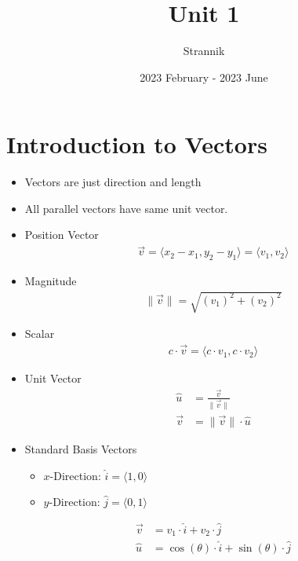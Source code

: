 \documentclass{article}
\title{Unit 1}
\author{Strannik}
\date{2023 February - 2023 June}
\begin{document}
\maketitle
\section{Introduction to Vectors}
\begin{itemize}
  \item Vectors are just direction and length
  \item All parallel vectors have same unit vector.
  \item{Position Vector}
  \begin{align}
    \vec{v} = \langle x_2 - x_1, y_2 - y_1 \rangle = \langle v_1, v_2 \rangle
  \end{align}
  \item{Magnitude}
  \begin{align}
    \|\vec{v}\| = \sqrt{(v_1)^2 + (v_2)^2}
  \end{align}
  \item{Scalar}
  \begin{align}
    c\cdot\vec{v} = \langle c\cdot v_1, c\cdot v_2 \rangle
  \end{align}
  \item{Unit Vector}
  \begin{align}
    \hat{u} &= \frac{\vec{v}}{\|\vec{v}\|} \\
    \vec{v} &= \|\vec{v}\|\cdot\hat{u}
  \end{align}
  \item{Standard Basis Vectors}
  \begin{itemize}
    \item $x$-Direction: $\hat{i} = \langle 1, 0 \rangle$
    \item $y$-Direction: $\hat{j} = \langle 0, 1 \rangle$
  \end{itemize}
  \begin{align}
    \vec{v} &= v_1\cdot\hat{i} + v_2\cdot\hat{j} \\
    \hat{u} &= \cos(\theta)\cdot\hat{i} + \sin(\theta)\cdot\hat{j}
  \end{align}
\end{itemize}
\end{document}
